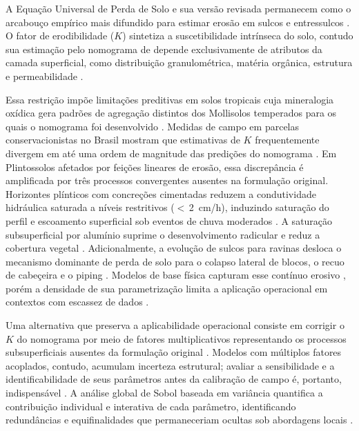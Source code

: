 \documentclass[preprint,review,12pt,authoryear]{elsarticle}
\begin{document}
A Equação Universal de Perda de Solo e sua versão revisada \citep{wischmeier_smith_1978,renard_et_al_1997} permanecem como o arcabouço empírico mais difundido para estimar erosão em sulcos e entressulcos \citep{alewell_et_al_2019}. O fator de erodibilidade ($K$) sintetiza a suscetibilidade intrínseca do solo, contudo sua estimação pelo nomograma de \citet{wischmeier_et_al_1971} depende exclusivamente de atributos da camada superficial, como distribuição granulométrica, matéria orgânica, estrutura e permeabilidade \citep{roemkens_et_al_1997}.

Essa restrição impõe limitações preditivas em solos tropicais cuja mineralogia oxídica gera padrões de agregação distintos dos Mollisolos temperados para os quais o nomograma foi desenvolvido \citep{alewell_et_al_2019,cassol_et_al_2023}. Medidas de campo em parcelas conservacionistas no Brasil mostram que estimativas de $K$ frequentemente divergem em até uma ordem de magnitude das predições do nomograma \citep{silva_et_al_2009,lafayette_cantalice_coutinho_2011}. Em Plintossolos afetados por feições lineares de erosão, essa discrepância é amplificada por três processos convergentes ausentes na formulação original. Horizontes plínticos com concreções cimentadas reduzem a condutividade hidráulica saturada a níveis restritivos ($<$\,2~cm/h), induzindo saturação do perfil e escoamento superficial sob eventos de chuva moderados \citep{wang_et_al_2020,embrapa_2018,horton_1933,bertoni_lombardi_neto_2017}. A saturação subsuperficial por alumínio suprime o desenvolvimento radicular e reduz a cobertura vegetal \citep{gura_et_al_2022}. Adicionalmente, a evolução de sulcos para ravinas desloca o mecanismo dominante de perda de solo para o colapso lateral de blocos, o recuo de cabeçeira e o piping \citep{poesen_2018,poesen_et_al_2003,kirkby_bracken_2009,vanmaercke_et_al_2021}. Modelos de base física capturam esse contínuo erosivo \citep{nearing_et_al_1989,sidorchuk_2006}, porém a densidade de sua parametrização limita a aplicação operacional em contextos com escassez de dados \citep{wilkinson_et_al_2024}.

Uma alternativa que preserva a aplicabilidade operacional consiste em corrigir o $K$ do nomograma por meio de fatores multiplicativos representando os processos subsuperficiais ausentes da formulação original \citep{alewell_et_al_2019}. Modelos com múltiplos fatores acoplados, contudo, acumulam incerteza estrutural; avaliar a sensibilidade e a identificabilidade de seus parâmetros antes da calibração de campo é, portanto, indispensável \citep{saltelli_et_al_2004}. A análise global de Sobol baseada em variância quantifica a contribuição individual e interativa de cada parâmetro, identificando redundâncias e equifinalidades que permaneceriam ocultas sob abordagens locais \citep{sobol_2001,francois_et_al_2024}.
\end{document}
